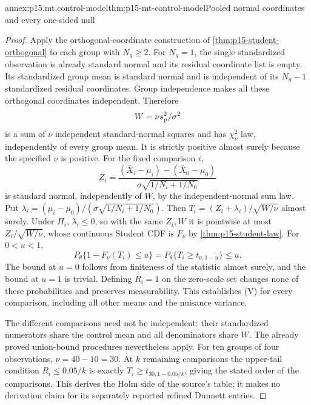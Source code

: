 \begin{annexitem}{annex:p15.mt.control-model}{thm:p15-mt-control-model}{Pooled normal coordinates and every one-sided null}
\begin{proof}
Apply the orthogonal-coordinate construction of
\cref{thm:p15-student-orthogonal} to each group with \(N_g\geq2\).
For \(N_g=1\), the single standardized observation is already standard
normal and its residual coordinate list is empty.
Its standardized group mean is standard normal and is independent of
its \(N_g-1\) standardized residual coordinates.
Group independence makes all these orthogonal coordinates independent.
Therefore
\[
 W=\nu s_{\rm p}^2/\sigma^2
\]
is a sum of \(\nu\) independent standard-normal squares and has
\(\chi^2_\nu\) law, independently of every group mean.
It is strictly positive almost surely because the specified \(\nu\) is positive.
For the fixed comparison \(i\),
\[
 Z_i=\frac{(\bar X_i-\mu_i)-(\bar X_0-\mu_0)}
                  {\sigma\sqrt{1/N_i+1/N_0}}
\]
is standard normal, independently of \(W\), by the independent-normal
sum law. Put
\(\lambda_i=(\mu_i-\mu_0)/(\sigma\sqrt{1/N_i+1/N_0})\).
Then \(T_i=(Z_i+\lambda_i)/\sqrt{W/\nu}\) almost surely.
Under \(H_i\), \(\lambda_i\leq0\), so with the same \(Z_i,W\) it is
pointwise at most \(Z_i/\sqrt{W/\nu}\), whose continuous Student CDF
is \(F_\nu\) by \cref{thm:p15-student-law}.
For \(0<u<1\),
\[
 P_\theta\{1-F_\nu(T_i)\leq u\}
 =P_\theta\{T_i\geq t_{\nu,1-u}\}\leq u.
\]
The bound at \(u=0\) follows from finiteness of the statistic almost
surely, and the bound at \(u=1\) is trivial. Defining \(R_i=1\) on
the zero-scale set changes none of these probabilities and preserves
measurability. This establishes (V) for every comparison, including all
other means and the nuisance variance.

The different comparisons need not be independent: their standardized
numerators share the control mean and all denominators share \(W\).
The already proved union-bound procedures nevertheless apply.
For ten groups of four observations, \(\nu=40-10=30\).
At \(k\) remaining comparisons the upper-tail condition
\(R_i\leq0.05/k\) is exactly \(T_i\geq t_{30,1-0.05/k}\), giving
the stated order of the comparisons. This derives the Holm side
of the source's table; it makes no derivation claim for its separately
reported refined Dunnett entries.
\end{proof}
\end{annexitem}


